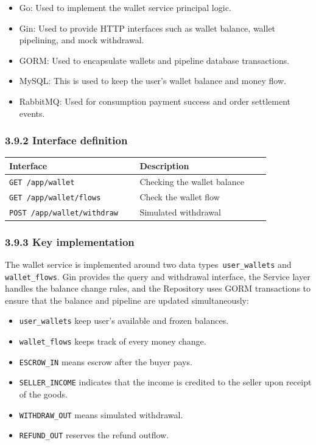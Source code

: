 \documentclass{article}
\begin{document}
\begin{itemize}
    \item Go: Used to implement the wallet service principal logic.
    \item Gin: Used to provide HTTP interfaces such as wallet balance, wallet pipelining, and mock withdrawal.
    \item GORM: Used to encapsulate wallets and pipeline database transactions.
    \item MySQL: This is used to keep the user's wallet balance and money flow.
    \item RabbitMQ: Used for consumption payment success and order settlement events.
\end{itemize}

\subsubsection{3.9.2 Interface definition}

\begin{longtable}{p{0.45\linewidth}p{0.45\linewidth}}
\toprule
\textbf{Interface} & \textbf{Description} \\
\midrule
\texttt{GET /app/wallet} & Checking the wallet balance \\
\texttt{GET /app/wallet/flows} & Check the wallet flow \\
\texttt{POST /app/wallet/withdraw} & Simulated withdrawal \\
\bottomrule
\end{longtable}

\subsubsection{3.9.3 Key implementation}

The wallet service is implemented around two data types\texttt{ user\_wallets} and \texttt{wallet\_flows}. Gin provides the query and withdrawal interface, the Service layer handles the balance change rules, and the Repository uses GORM transactions to ensure that the balance and pipeline are updated simultaneously:

\begin{itemize}
    \item \texttt{user\_wallets} keep user's available and frozen balances.
    \item \texttt{wallet\_flows} keeps track of every money change.
    \item \texttt{ESCROW\_IN} means escrow after the buyer pays.
    \item \texttt{SELLER\_INCOME} indicates that the income is credited to the seller upon receipt of the goods.
    \item \texttt{WITHDRAW\_OUT} means simulated withdrawal.
    \item \texttt{REFUND\_OUT} reserves the refund outflow.
\end{itemize}
\end{document}

